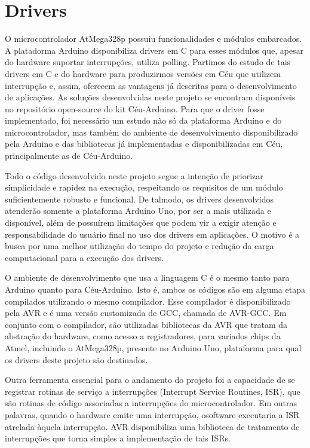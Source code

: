 \documentclass{article}
\begin{document}
\section{Drivers}
\tab O microcontrolador AtMega328p possuiu funcionalidades e módulos embarcados. A platadorma Arduino disponibiliza drivers em C para esses módulos que, apesar do hardware suportar interrupções, utiliza polling. Partimos do estudo de tais drivers em C e do hardware para produzirmos versões em Céu que utilizem interrupção e, assim, oferecem as vantagens já descritas para o desenvolvimento de aplicações. As soluções desenvolvidas neste projeto se encontram disponíveis no repositório open-source do kit Céu-Arduino. Para que o driver fosse implementado, foi necessário um estudo não só da plataforma Arduino e do microcontrolador, mas também do ambiente de desenvolvimento disponibilizado pela Arduino e das bibliotecas já implementadas e disponibilizadas em Céu, principalmente as de Céu-Arduino.
\par Todo o código desenvolvido neste projeto segue a intenção de priorizar simplicidade e rapidez na execução, respeitando os requisitos de um módulo suficientemente robusto e funcional. De talmodo, os drivers desenvolvidos atenderão somente a plataforma Arduino Uno, por ser a mais utilizada e disponível, além de possuírem limitações que podem vir a exigir atenção e responsabilidade do usuário final no uso dos drivers em aplicações. O motivo é a busca por uma melhor utilização do tempo do projeto e redução da carga computacional para a execução dos drivers.
\par O ambiente de desenvolvimento que usa a linguagem C é o mesmo tanto para Arduino quanto para Céu-Arduino. Isto é, ambos os códigos são em alguma etapa compilados utilizando o mesmo compilador. Esse compilador é disponibilizado pela AVR e é uma versão customizada de GCC, chamada de AVR-GCC. Em conjunto com o compilador, são utilizadas bibliotecas da AVR que tratam da abstração do hardware, como acesso a registradores, para variados chips da Atmel, incluindo o AtMega328p, presente no Arduino Uno, plataforma para qual os drivers deste projeto são destinados.
\par Outra ferramenta essencial para o andamento do projeto foi a capacidade de se registrar rotinas de serviço a interrupções (Interrupt Service Routines, ISR), que são rotinas de código associadas a interrupções do microcontrolador. Em outras palavras, quando o hardware emite uma interrupção, osoftware executaria a ISR atrelada àquela interrupção. AVR disponibiliza uma biblioteca de tratamento de interrupções que torna simples a implementação de tais ISRs.
\end{document}
